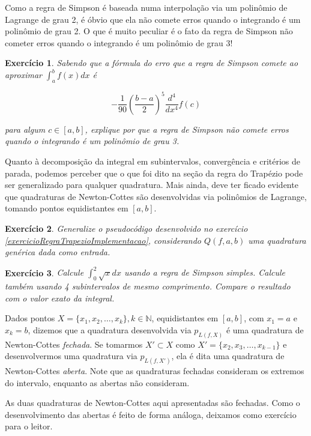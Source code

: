 \documentclass[]{article}
\newtheorem{exercicio}{Exercício}
\numberwithin{equation}{section}
\begin{document}
Como a regra de Simpson é baseada numa interpolação via um polinômio de Lagrange de grau 2, é óbvio que ela não comete erros quando o integrando é um polinômio de grau 2. O que é muito peculiar é o fato da regra de Simpson não cometer erros quando o integrando é um polinômio de grau 3!

\begin{exercicio}
	Sabendo que a fórmula do erro que a regra de Simpson comete ao aproximar $\int_{a}^{b} f(x) dx$ é

$$
- \frac{1}{90} \left(\frac{b - a}{2}\right)^5 \frac{d^4}{dx^4} f(c)
$$

	para algum $c \in [a, b]$, explique por que a regra de Simpson não comete erros quando o integrando é um polinômio de grau 3.
\end{exercicio}

Quanto à decomposição da integral em subintervalos, convergência e critérios de parada, podemos perceber que o que foi dito na seção da regra do Trapézio pode ser generalizado para qualquer quadratura. Mais ainda, deve ter ficado evidente que quadraturas de Newton-Cottes são desenvolvidas via polinômios de Lagrange, tomando pontos equidistantes em $[a, b]$.

\begin{exercicio}
	Generalize o pseudocódigo desenvolvido no exercício \ref{exercicioRegraTrapezioImplementacao}, considerando $Q(f, a, b)$ uma quadratura genérica dada como entrada.
\end{exercicio}

\begin{exercicio}
	Calcule $\int_{0}^{2}\sqrt{x}dx$ usando a regra de Simpson simples. Calcule também usando 4 subintervalos de mesmo comprimento. Compare o resultado com o valor exato da integral.
\end{exercicio}

Dados pontos $X = \{x_1, x_2, \dots, x_k\}, k \in \mathbb{N}$, equidistantes em $[a, b]$, com $x_1 = a$ e $x_k = b$, dizemos que a quadratura desenvolvida via $p_{L(f, X)}$ é uma quadratura de Newton-Cottes \emph{fechada}. Se tomarmos $X' \subset X$ como $X' = \{x_2, x_3, \dots, x_{k - 1}\}$ e desenvolvermos uma quadratura via $p_{L(f, X')}$, ela é dita uma quadratura de Newton-Cottes \emph{aberta}. Note que as quadraturas fechadas consideram os extremos do intervalo, enquanto as abertas não consideram.

As duas quadraturas de Newton-Cottes aqui apresentadas são fechadas. Como o desenvolvimento das abertas é feito de forma análoga, deixamos como exercício para o leitor.
\end{document}
